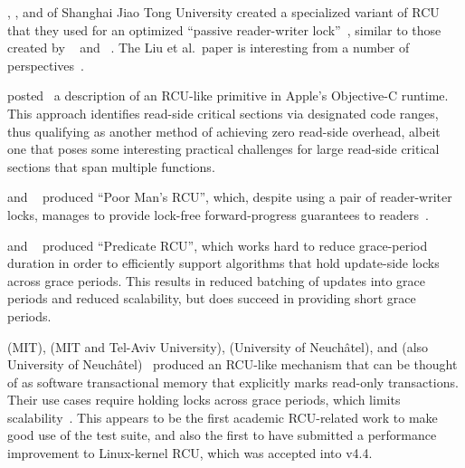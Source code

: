 , , and  of
Shanghai Jiao Tong University
created a specialized variant of RCU that they used for an optimized
``passive reader-writer lock''~\cite{RanLiu2014PassiveRWLock}, similar to
those created by ~\cite{GauthamShenoy2006RCUrwlock} and
~\cite{SrivatsaSBhat2014RCUrwlock}.
The Liu et al.\ paper is interesting from a number of
perspectives~\cite{PaulEMcKenney2014ReadMostly}.

 posted~\cite{MikeAsh2015Apple} a description of an RCU-like
primitive in Apple's Objective-C runtime.
This approach identifies read-side critical sections via designated
code ranges, thus qualifying as another method of achieving
zero read-side overhead, albeit one that poses some interesting
practical challenges for large read-side critical sections that
span multiple functions.

 and ~\cite{PedroRmalhete2015PoorMansRCU}
produced ``Poor Man's RCU'', which, despite using a pair of reader-writer
locks, manages to provide lock-free forward-progress guarantees to
readers~\cite{PaulEMcKenney2015ReadMostly}.

 and ~\cite{Arbel:2015:PRR:2858788.2688518}
produced ``Predicate RCU'', which works hard to reduce grace-period
duration in order to efficiently support algorithms that hold
update-side locks across grace periods.
This results in reduced batching of updates into grace periods
and reduced scalability, but does succeed in providing short
grace periods.

\QuickQuizEnd

 (MIT),  (MIT and Tel-Aviv University),
 (University of Neuch\^{a}tel), and  (also
University of Neuch\^{a}tel)~\cite{Matveev:2015:RLS:2815400.2815406}
produced an RCU-like mechanism that can be thought of as
software transactional memory that explicitly marks
read-only transactions.
Their use cases require holding locks across grace periods, which limits
scalability~\cite{PaulEMcKenney2015ReadMostly,PaulEMcKenney2015ReadMostlySidebar}.
This appears to be the first academic RCU-related work to
make good use of the  test suite, and also the
first to have submitted a performance improvement to Linux-kernel
RCU, which was accepted into v4.4.

